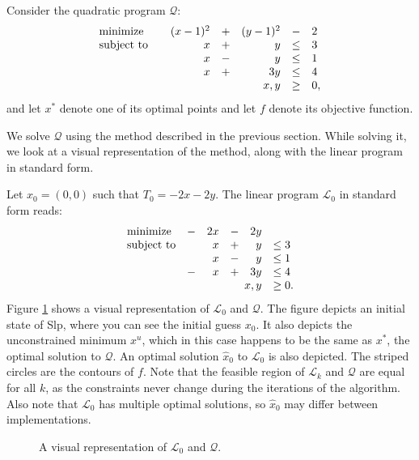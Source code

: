 Consider the quadratic program $\mathcal{Q}$:
\[
\begin{array}{lcrcrcl}
\textrm{minimize}           & &   (x-1)^2 &+&   (y-1)^2 & - &  2 \\
\textrm{subject to}         & &         x &+&         y &\leq& 3 \\
                            & &         x &-&         y &\leq& 1 \\
                            & &         x &+&       3 y &\leq& 4 \\
                 \multicolumn{5}{r}{x,y}                &\geq& 0,
\end{array}
\]
and let $x^*$ denote one of its optimal points and let $f$ denote its objective
function.

We solve $\mathcal{Q}$ using the method described in the previous
section. While solving it, we look at a visual representation of the
method, along with the linear program in standard form.

Let $x_0 = (0,0)$ such that $T_0 = -2x - 2y$. The linear program
$\mathcal{L}_0$ in standard form reads:
\[
\begin{array}{lcrcrl}
    \textrm{minimize}   &-& 2 x &-& 2 y \\
    \textrm{subject to} & &   x &+&   y & \leq 3 \\
                        & &   x &-&   y & \leq 1 \\
                        &-&   x &+& 3 y & \leq 4 \\
     \multicolumn{5}{r}{x,y}            & \geq 0.
\end{array}
\]
Figure \ref{fig:lp1} shows a visual representation of $\mathcal{L}_0$ and
$\mathcal{Q}$.
The figure depicts an initial state
of Slp, where you can see the initial guess $x_0$. It also
depicts the unconstrained minimum $x^u$, which in this case
happens to be the same as $x^*$, the optimal solution to
$\mathcal{Q}$. An optimal solution $\hat{x}_0$ to $\mathcal{L}_0$
is also depicted. The striped circles are the contours of $f$.
Note that the feasible region of $\mathcal{L}_k$ and
$\mathcal{Q}$ are equal for all $k$, as the constraints never change during the
iterations of the algorithm. Also note that $\mathcal{L}_0$ has multiple
optimal solutions, so $\hat{x}_0$ may differ between implementations.

\begin{figure}[ht!]
    \centering
    
    \caption{A visual representation of $\mathcal{L}_0$ and $\mathcal{Q}$.}
    \label{fig:lp1}
\end{figure}

